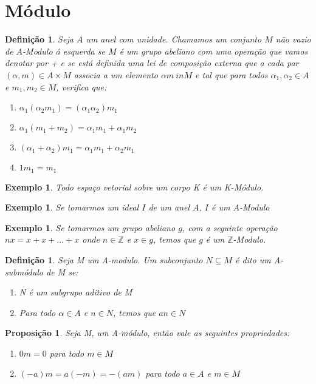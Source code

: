\documentclass[10pt,a4paper]{article}
\newtheorem{proposition}[theorem]{Proposição}
\newtheorem{example}[theorem]{Exemplo}
\newtheorem{definition}[theorem]{Definição}
\begin{document}
\section{Módulo}

\begin{definition}
	Seja $A$ um anel com unidade. Chamamos um conjunto $M$ não vazio de $A$-Modulo á esquerda se $M$ é um grupo abeliano com uma operação que vamos denotar por + e se está definida uma lei de composição externa que a cada par $(\alpha, m) \in A\times M$ associa a um elemento $\alpha m \ in M$ e tal que para todos $\alpha_1, \alpha_2 \in A$ e $m_1, m_2 \in M$, verifica que: 
	\begin{enumerate}
		\item $\alpha_1(\alpha_2 m_1) = (\alpha_1 \alpha_2)m_1$
		\item $\alpha_1(m_1+m_2) = \alpha_1 m_1 + \alpha_1 m_2$
		\item $(\alpha_1+\alpha_2)m_1=\alpha_1 m_1+\alpha_2 m_1$
		\item $1m_1=m_1$
	\end{enumerate}
\end{definition}

\begin{example}
	Todo espaço vetorial sobre um corpo K é um K-Módulo.
\end{example}

\begin{example}
	Se tomarmos um ideal $I$ de um anel $A$, $I$ é um $A$-Modulo
\end{example}

\begin{example}
	Se tomarmos um grupo abeliano $g$, com a seguinte operação $nx = x+x+...+x$ onde $n \in \mathbb{Z}$ e $x \in g$, temos que $g$ é um $\mathbb{Z}$-Modulo.
\end{example}

\begin{definition}
	Seja M um A-modulo. Um subconjunto $N \subseteq M$ é dito um A-submódulo de M se:
	\begin{enumerate}
		\item N é um subgrupo aditivo de M
		\item Para todo $\alpha \in A$ e $n \in N$, temos que $an \in N$
	\end{enumerate}
\end{definition}

\begin{proposition}
	Seja M, um A-módulo, então vale as seguintes propriedades:
	\begin{enumerate}
		\item $0m=0$ para todo $m \in M$
		\item $(-a)m=a(-m)=-(am)$ para todo $a \in A$ e $m \in M$
	\end{enumerate}
\end{proposition}
\end{document}
